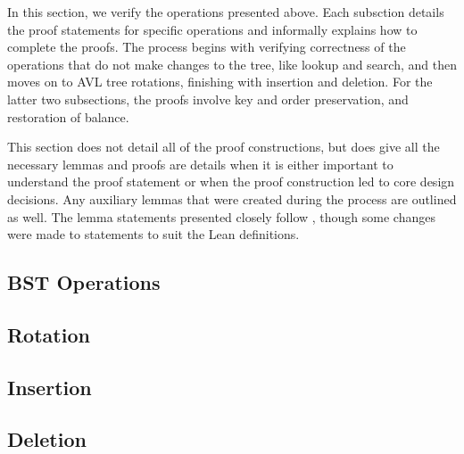 In this section, we verify the operations presented above. Each subsction details the proof statements for specific operations and informally explains how to complete the proofs. The process begins with verifying correctness of the operations that do not make changes to the tree, like lookup and search, and then moves on to AVL tree rotations, finishing with insertion and deletion. For the latter two subsections, the proofs involve key and order preservation, and restoration of balance. 

This section does not detail all of the proof constructions, but does give all the necessary lemmas and proofs are details when it is either important to understand the proof statement or when the proof construction led to core design decisions. Any auxiliary lemmas that were created during the process are outlined as well. The lemma statements presented closely follow \cite{textbook:discrete_computer}, though some changes were made to statements to suit the Lean definitions.

\subsection{BST Operations}


\subsection{Rotation}


\subsection{Insertion}


\subsection{Deletion}
